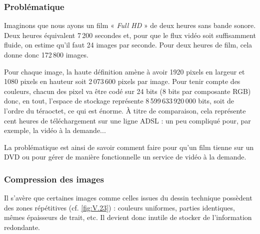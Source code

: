 \subsubsection[Problématique]{Problématique}
\label{subsub:V.3.1.1}

Imaginons que nous ayons un film « \textit{Full HD} » de deux heures sans bande sonore. Deux heures équivalent 7\,200 secondes et, pour que le flux vidéo soit suffisamment fluide, on estime qu'il faut 24 images par seconde. Pour deux heures de film, cela donne donc 172\,800 images.

Pour chaque image, la haute définition amène à avoir 1920 pixels en largeur et 1080 pixels en hauteur soit 2\,073\,600 pixels par image. Pour tenir compte des couleurs, chacun des pixel va être codé sur 24 bits (8 bits par composante RGB) donc, en tout, l'espace de stockage représente 8\,599\,633\,920\,000 bits, soit de l'ordre du téraoctet, ce qui est énorme. À titre de comparaison, cela représente cent heures de téléchargement sur une ligne ADSL : un peu compliqué pour, par exemple, la vidéo à la demande...

La problématique est ainsi de savoir comment faire pour qu'un film tienne sur un DVD ou pour gérer de manière fonctionnelle un service de vidéo à la demande.

\subsubsection[Images]{Compression des images}
\label{subsub:V.3.1.2}

Il s'avère que certaines images comme celles issues du dessin technique possèdent des zones répétitives (cf. \cref{fig:V.23}) : couleurs uniformes, parties identiques, mêmes épaisseurs de trait, etc. Il devient donc inutile de stocker de l'information redondante.

